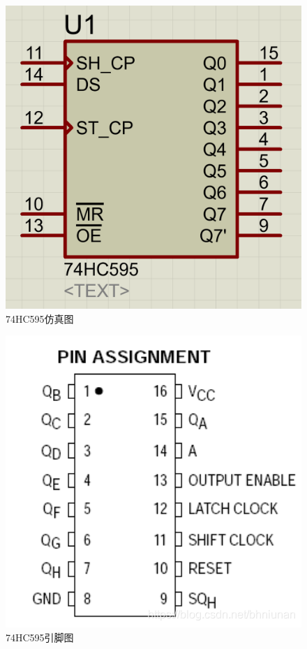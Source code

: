 \documentclass{textreportclass}  %
\begin{document}
		
		\begin{figure}[htbp]
			\centering
			\includegraphics[scale=0.2]{Fig/74HC595.png}
			\caption{74HC595仿真图}\label{Fig.8}
		\end{figure}
		
		\begin{figure}[htbp]
			\centering
			\includegraphics[scale=0.2]{Fig/74HC595(3).png}
			\caption{74HC595引脚图}\label{Fig.7}
		\end{figure}
		
\end{document}
